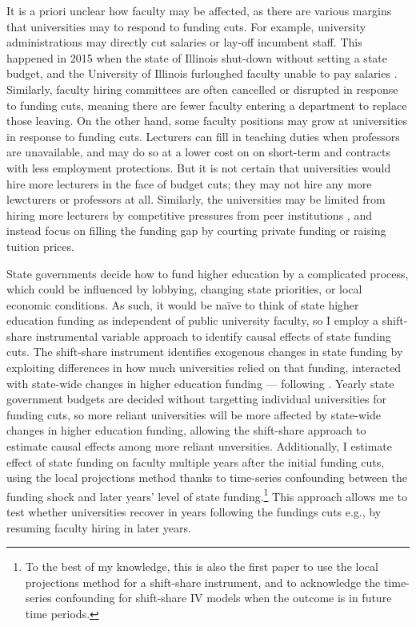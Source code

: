 It is a priori unclear how faculty may be affected, as there are various margins that universities may to respond to funding cuts.
For example, university administrations may directly cut salaries or lay-off incumbent staff.
This happened in 2015 when the state of Illinois shut-down without setting a state budget, and the University of Illinois furloughed faculty unable to pay salaries \citep{furlough2010}.
Similarly, faculty hiring committees are often cancelled or disrupted in response to funding cuts, meaning there are fewer faculty entering a department to replace those leaving.
On the other hand, some faculty positions may grow at universities in response to funding cuts.
Lecturers can fill in teaching duties when professors are unavailable, and may do so at a lower cost  on on short-term and contracts with less employment protections.
But it is not certain that universities would hire more lecturers in the face of budget cuts; they may not hire any more lewcturers or professors at all.
Similarly, the universities may be limited from hiring more lecturers by competitive pressures from peer institutions \citep{hoxby2009changing,urquiola2020markets}, and instead focus on filling the funding gap by courting private funding or raising tuition prices.

State governments decide how to fund higher education by a complicated process, which could be influenced by lobbying, changing state priorities, or local economic conditions.
As such, it would be na\"ive to think of state higher education funding as independent of public university faculty, so I employ a shift-share instrumental variable approach to identify causal effects of state funding cuts.
The shift-share instrument identifies exogenous changes in state funding by exploiting differences in how much universities relied on that funding, interacted with state-wide changes in higher education funding --- following \cite{NBERw23736,NBERw27885}.
Yearly state government budgets are decided without targetting individual universities for funding cuts, so more reliant universities will be more affected by state-wide changes in higher education funding, allowing the shift-share approach to estimate causal effects among more reliant unversities.
Additionally, I estimate effect of state funding on faculty multiple years after the initial funding cuts, using the local projections method thanks to time-series confounding between the funding shock and later years' level of state funding.\footnote{
    To the best of my knowledge, this is also the first paper to use the local projections method for a shift-share instrument, and to acknowledge the time-series confounding for shift-share IV models when the outcome is in future time periods.
}
This approach allows me to test whether universities recover in years following the fundings cuts e.g., by resuming faculty hiring in later years. 

